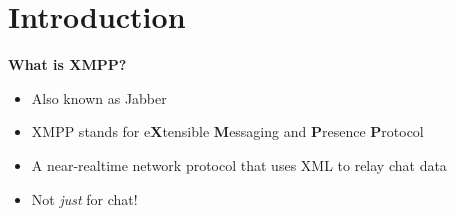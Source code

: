 \part{Introduction}

\newpage
\begin{center}
{\huge \bfseries What is XMPP?}
\end{center}
\pause

\begin{itemize}
\item Also known as Jabber
\pause
\item XMPP stands for e\textbf{X}tensible \textbf{M}essaging and \textbf{P}resence \textbf{P}rotocol
\pause
\item A near-realtime network protocol that uses XML to relay chat data
\pause
\item Not \textit{just} for chat!
\end{itemize}
